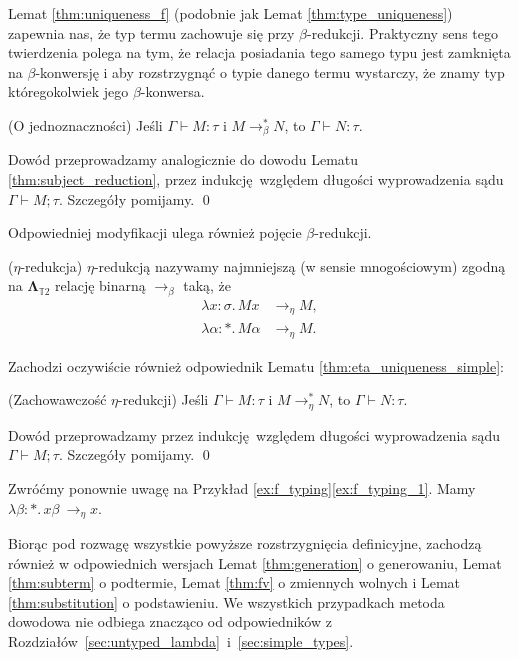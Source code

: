 Lemat \ref{thm:uniqueness_f} (podobnie jak Lemat \ref{thm:type_uniqueness}) zapewnia nas, że typ termu zachowuje się przy \(\beta\)-redukcji. Praktyczny sens tego twierdzenia polega na tym, że relacja posiadania tego samego typu jest zamknięta na \(\beta\)-konwersję i aby rozstrzygnąć o typie danego termu wystarczy, że znamy typ któregokolwiek jego \(\beta\)-konwersa.

\begin{lemat}(O jednoznaczności)\label{thm:uniqueness_f}
  Jeśli \(\Gamma\vdash M:\tau\) i \(M\to^{*}_\beta N\), to \(\Gamma\vdash N:\tau\).
\end{lemat}
\begin{dowod}
  Dowód przeprowadzamy analogicznie do dowodu Lematu \ref{thm:subject_reduction}, przez indukcję względem długości wyprowadzenia sądu \(\Gamma\vdash M;\tau\). Szczegóły pomijamy. \qed
\end{dowod}

Odpowiedniej modyfikacji ulega również pojęcie \(\beta\)-redukcji.
  \begin{definicja}(\(\eta\)-redukcja)
    \(\eta\)-redukcją nazywamy najmniejszą (w sensie mnogościowym) zgodną na \(\mathbf{\Lambda}_{\mathbb{T}2}\) relację binarną \(\to_\beta\) taką, że
  \begin{align*}
    \lambda x:\sigma.\,Mx &\to_\eta M,\\
    \lambda \alpha:*.\,M\alpha &\to_\eta M.
  \end{align*}
  \end{definicja}

Zachodzi oczywiście również odpowiednik Lematu \ref{thm:eta_uniqueness_simple}:
\begin{lemat}(Zachowawczość \(\eta\)-redukcji)\label{thm:eta_uniqueness_f}
  Jeśli \(\Gamma\vdash M:\tau\) i \(M\to^{*}_\eta N\), to \(\Gamma\vdash N:\tau\).
\end{lemat}
\begin{dowod}
  Dowód przeprowadzamy przez indukcję względem długości wyprowadzenia sądu \(\Gamma\vdash M;\tau\). Szczegóły pomijamy. \qed
\end{dowod}

\begin{przyklad} Zwróćmy ponownie uwagę na Przykład \ref{ex:f_typing}\ref{ex:f_typing_1}. Mamy
  \(\lambda \beta : *.\,x\beta\ \to_\eta x\).
\end{przyklad}

Biorąc pod rozwagę wszystkie powyższe rozstrzygnięcia definicyjne, zachodzą również w odpowiednich wersjach Lemat \ref{thm:generation} o generowaniu, Lemat \ref{thm:subterm} o podtermie, Lemat \ref{thm:fv} o zmiennych wolnych i Lemat \ref{thm:substitution} o podstawieniu. We wszystkich przypadkach metoda dowodowa nie odbiega znacząco od odpowiedników z Rozdziałów~\ref{sec:untyped_lambda}~i~\ref{sec:simple_types}.

